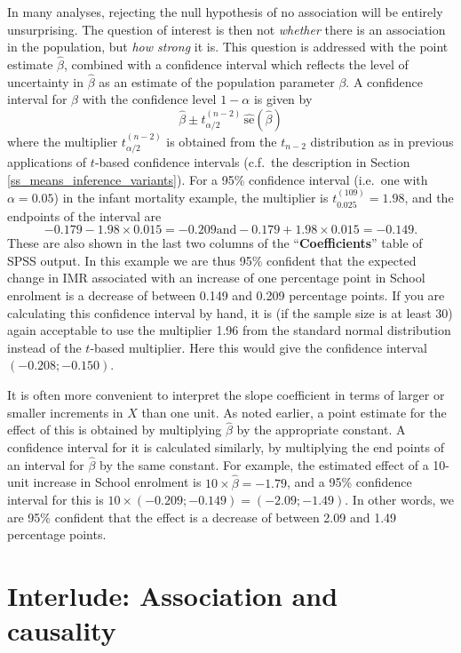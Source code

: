 In many analyses, rejecting the null hypothesis of no association will
be entirely unsurprising. The question of interest is then not
\emph{whether} there is an association in the population, but \emph{how
strong} it is. This question is addressed with the point estimate
$\hat{\beta}$, combined with a confidence interval which reflects the
level of uncertainty in $\hat{\beta}$ as an estimate of the population
parameter $\beta$. A confidence interval for $\beta$ with the
confidence level $1-\alpha$ is given by
\begin{equation}
\hat{\beta} \pm t_{\alpha/2}^{(n-2)} \, \hat{\text{se}}(\hat{\beta})
\label{cibeta}
\end{equation}
where the multiplier $t_{\alpha/2}^{(n-2)}$ is obtained from the
$t_{n-2}$ distribution as in previous applications of $t$-based
confidence intervals (c.f.\ the description in Section
\ref{ss_means_inference_variants}).
For a 95\% confidence interval (i.e.\ one with $\alpha=0.05$) in the
infant mortality example, the multiplier is $t_{0.025}^{(109)}=1.98$,
and the endpoints of the interval are
\[
-0.179-1.98\times 0.015=-0.209  \text{and}
-0.179+1.98\times 0.015=-0.149.
\]
These are also shown in the last two columns of the
``\textbf{Coefficients}'' table of SPSS output. In this example we are
thus 95\% confident that the expected change in IMR associated with an
increase of one percentage point in School enrolment is a decrease of
between 0.149 and 0.209 percentage points. If you are calculating this
confidence interval by hand, it is (if the sample size is at least 30)
again acceptable to use the multiplier 1.96 from the standard normal
distribution instead of the $t$-based multiplier. Here this would give
the confidence interval $(-0.208; -0.150)$.

It is often more convenient to interpret the slope coefficient in terms
of larger or smaller increments in $X$ than one unit. As noted earlier,
a point estimate for the effect of this is obtained by multiplying
$\hat{\beta}$ by the appropriate constant. A confidence interval for it
is calculated similarly, by multiplying the end points of an
interval for $\hat{\beta}$ by the same constant. For example, the
estimated effect of a 10-unit increase in School enrolment is $10\times
\hat{\beta}=-1.79$, and a 95\% confidence interval for this is $10\times
(-0.209; -0.149)=(-2.09; -1.49)$. In other words, we are 95\% confident
that the effect is a decrease of between 2.09 and 1.49 percentage
points.

\newpage
\section{Interlude: Association and causality}
\label{s_regression_causality}


